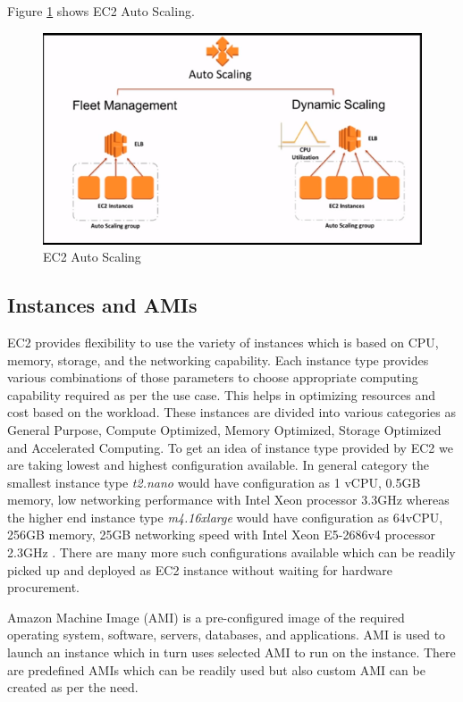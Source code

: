 Figure \ref{f:ec2-auto-scaling} shows EC2 Auto Scaling.
\begin{figure}[!ht]
  \centering\includegraphics[width=\columnwidth]{images/ec2AutoScaling.PNG}
  \caption{EC2 Auto Scaling \cite{hid-sp18-402-www-aws-ec2autoscaling}}\label{f:ec2-auto-scaling}
\end{figure}

\subsection{Instances and AMIs}
EC2 provides flexibility to use the variety of instances which is based on CPU, memory, storage, and the networking capability. Each instance type provides various combinations of those parameters to choose appropriate computing capability required as per the use case. This helps in optimizing resources and cost based on the workload. These instances are divided into various categories as General Purpose, Compute Optimized, Memory Optimized, Storage Optimized and Accelerated Computing. To get an idea of instance type provided by EC2 we are taking lowest and highest configuration available. In general category the smallest instance type \emph{t2.nano} would have configuration as 1 vCPU, 0.5GB memory, low networking performance with Intel Xeon processor 3.3GHz whereas the higher end instance type \emph{m4.16xlarge} would have configuration as 64vCPU, 256GB memory, 25GB networking speed with Intel Xeon E5-2686v4 processor 2.3GHz \cite{hid-sp18-402-www-aws-ec2instance}. There are many more such configurations available which can be readily picked up and deployed as EC2 instance without waiting for hardware procurement.

Amazon Machine Image (AMI) \cite{hid-sp18-402-www-aws-ec2instance} is a pre-configured image of the required operating system, software, servers, databases, and applications. AMI is used to launch an instance which in turn uses selected AMI to run on the instance. There are predefined AMIs which can be readily used but also custom AMI can be created as per the need.

